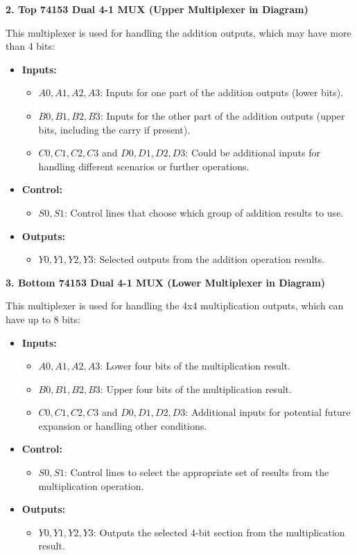\documentclass[12pt]{article}
\begin{document}
\textbf{2. Top 74153 Dual 4-1 MUX (Upper Multiplexer in Diagram)}

This multiplexer is used for handling the addition outputs, which may have more than 4 bits:
\begin{itemize}
	\item \textbf{Inputs:}
	      \begin{itemize}
		      \item \( A0, A1, A2, A3 \): Inputs for one part of the addition outputs (lower bits).
		      \item \( B0, B1, B2, B3 \): Inputs for the other part of the addition outputs (upper bits, including the carry if present).
		      \item \( C0, C1, C2, C3 \) and \( D0, D1, D2, D3 \): Could be additional inputs for handling different scenarios or further operations.
	      \end{itemize}
	\item \textbf{Control:}
	      \begin{itemize}
		      \item \( S0, S1 \): Control lines that choose which group of addition results to use.
	      \end{itemize}
	\item \textbf{Outputs:}
	      \begin{itemize}
		      \item \( Y0, Y1, Y2, Y3 \): Selected outputs from the addition operation results.
	      \end{itemize}
\end{itemize}

\textbf{3. Bottom 74153 Dual 4-1 MUX (Lower Multiplexer in Diagram)}

This multiplexer is used for handling the 4x4 multiplication outputs, which can have up to 8 bits:
\begin{itemize}
	\item \textbf{Inputs:}
	      \begin{itemize}
		      \item \( A0, A1, A2, A3 \): Lower four bits of the multiplication result.
		      \item \( B0, B1, B2, B3 \): Upper four bits of the multiplication result.
		      \item \( C0, C1, C2, C3 \) and \( D0, D1, D2, D3 \): Additional inputs for potential future expansion or handling other conditions.
	      \end{itemize}
	\item \textbf{Control:}
	      \begin{itemize}
		      \item \( S0, S1 \): Control lines to select the appropriate set of results from the multiplication operation.
	      \end{itemize}
	\item \textbf{Outputs:}
	      \begin{itemize}
		      \item \( Y0, Y1, Y2, Y3 \): Outputs the selected 4-bit section from the multiplication result.
	      \end{itemize}
\end{itemize}
\end{document}
